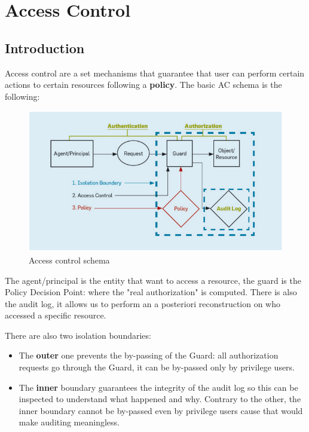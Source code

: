 \section{Access Control}
\subsection{Introduction}
Access control are a set mechanisms that guarantee that user can perform certain actions to certain resources following a \textbf{policy}. The basic AC schema is the following:
\begin{figure}[h!]
    \centering
    \includegraphics[scale=0.5]{images/ac.png}
    \caption{Access control schema}
    \label{fig:ac}
\end{figure}

\FloatBarrier

The agent/principal is the entity that want to access a resource, the guard is the Policy Decision Point: where the "real authorization" is computed. There is also the audit log, it allows us to perform an a posteriori reconstruction on who accessed a specific resource.

There are also two isolation boundaries:
\begin{itemize}
    \item The \textbf{outer} one prevents the by-passing of the Guard: all authorization requests go through the Guard, it can be by-passed only by privilege users.
    \item The \textbf{inner} boundary guarantees the integrity of the audit log so this can be inspected to understand what happened and why. Contrary to the other, the inner boundary cannot be by-passed even by privilege users cause that would make auditing meaningless.
\end{itemize}


